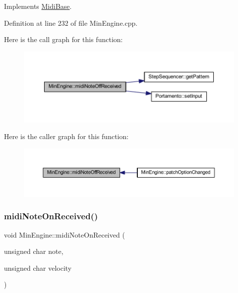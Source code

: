 Implements \hyperlink{class_midi_base_aa26f04b4ead215bce201e480faf7c914}{Midi\+Base}.



Definition at line 232 of file Min\+Engine.\+cpp.

Here is the call graph for this function\+:
\nopagebreak
\begin{figure}[H]
\begin{center}
\leavevmode
\includegraphics[width=350pt]{d4/d0f/class_min_engine_aaab036105fa3dce51cc8c8345f2edcfe_cgraph}
\end{center}
\end{figure}
Here is the caller graph for this function\+:
\nopagebreak
\begin{figure}[H]
\begin{center}
\leavevmode
\includegraphics[width=350pt]{d4/d0f/class_min_engine_aaab036105fa3dce51cc8c8345f2edcfe_icgraph}
\end{center}
\end{figure}
\mbox{\label{class_min_engine_a108d70cfac8c363fbf6445f679dcf4d5}} 
\subsubsection{\texorpdfstring{midi\+Note\+On\+Received()}{midiNoteOnReceived()}}
{\footnotesize\ttfamily void Min\+Engine\+::midi\+Note\+On\+Received (\begin{DoxyParamCaption}\item[{unsigned char}]{note,  }\item[{unsigned char}]{velocity }\end{DoxyParamCaption})\hspace{0.3cm}{\ttfamily [virtual]}}



